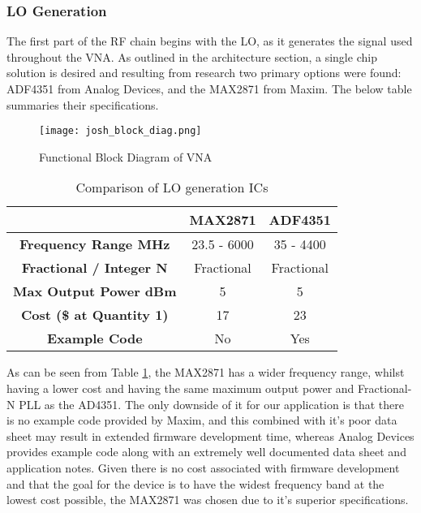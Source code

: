 \subsubsection{LO Generation}
The first part of the RF chain begins with the LO, as it generates the signal used throughout the VNA. As outlined in the architecture section, a single chip solution is desired and resulting from research two primary options were found: ADF4351 from Analog Devices, and the MAX2871 from Maxim. The below table summaries their specifications. 

\begin{landscape}
	\begin{figure}
		\centering
		\texttt{[image: josh\_block\_diag.png]}
		\caption{Functional Block Diagram of VNA}
		\label{fig:vna_block_diag}
	\end{figure}
\end{landscape}

\begin{table}[H]
	\caption{Comparison of LO generation ICs}
	\label{table:lo_comparison}
	\centering
\begin{tabular}{|c|c|c|}
	\hline
	\multicolumn{1}{|l|}{}          & \textbf{MAX2871} & \textbf{ADF4351} \\ \hline
	\textbf{Frequency Range MHz}    & 23.5 - 6000      & 35 - 4400        \\ \hline
	\textbf{Fractional / Integer N} & Fractional       & Fractional       \\ \hline
	\textbf{Max Output Power dBm}   & 5                & 5                \\ \hline
	\textbf{Cost (\$ at Quantity 1)}& 17               & 23             \\ \hline
	\textbf{Example Code}           & No               & Yes              \\ \hline
\end{tabular}
\end{table}

As can be seen from Table \ref{table:lo_comparison}, the MAX2871 has a wider frequency range, whilst having a lower cost and having the same maximum output power and Fractional-N PLL as the AD4351. The only downside of it for our application is that there is no example code provided by Maxim, and this combined with it's poor data sheet may result in extended firmware development time, whereas Analog Devices provides example code along with an extremely well documented data sheet and application notes. Given there is no cost associated with firmware development and that the goal for the device is to have the widest frequency band at the lowest cost possible, the MAX2871 was chosen due to it's superior specifications. 

